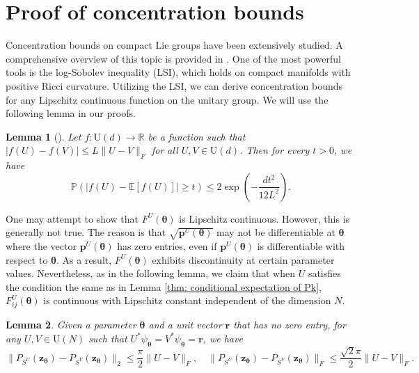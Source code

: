 \documentclass{amsart}
\theoremstyle{plain}
\newtheorem{lemma}{Lemma}
\theoremstyle{definition}
\theoremstyle{remark}
\newcommand{\RR}{\mathbb{R}}
\newcommand{\PP}{\mathbb{P}}
\newcommand{\EE}{\mathbb{E}}
\begin{document}
\section{Proof of concentration bounds}\label{sec:concentration}
Concentration bounds on compact Lie groups have been extensively studied. A comprehensive overview of this topic is provided in \cite{meckes2019random}. One of the most powerful tools is the log-Sobolev inequality (LSI), which holds on compact manifolds with positive Ricci curvature. Utilizing the LSI, we can derive concentration bounds for any Lipschitz continuous function on the unitary group. We will use the following lemma in our proofs. 
\begin{lemma}[\cite{meckes2019random}]
\label{lem:concentration}
    Let $f:\mathrm U(d)\to \RR$ be a function such that $|f(U)-f(V)|\leq L\|U-V\|_F$ for all $U,V\in \mathrm U(d)$. Then for every $t>0$, we have
    \begin{equation}
        \label{eq:concentration1}
        \PP(|f(U)-\EE[f(U)]|\geq t)\leq 2\exp\left(-\frac{dt^2}{12L^2}\right).
    \end{equation}
\end{lemma}
One may attempt to show that $F^U(\bm\theta)$ is Lipschitz continuous. However, this is generally not true. The reason is that $\sqrt{\bm p^U(\bm\theta)}$ may not be differentiable at $\bm\theta$ where the vector $\bm p^U(\bm\theta)$ has zero entries, even if $\bm p^U(\bm\theta)$ is differentiable with respect to $\bm\theta$. As a result, $F^U(\bm\theta)$ exhibits discontinuity at certain parameter values. Nevertheless, as in the following lemma, we claim that when $U$ satisfies the condition the same as in Lemma \ref{thm: conditional expectation of Pk}, $F_{ij}^U(\bm\theta)$ is continuous with Lipschitz constant independent of the dimension $N$. 
\begin{lemma}
\label{lem:keyLip}
    Given a parameter $\bm\theta$ and a unit vector $\bm r$ that has no zero entry, for any $U,V\in \mathrm U(N)$ such that $U^*\psi_{\bm\theta}=V^*\psi_{\bm\theta}=\bm r$, we have 
    \[\|P_{S^U}(\bm z_{\bm\theta})-P_{S^V}(\bm z_{\bm\theta})\|_2\leq \frac{\pi}{2}\|U-V\|_F,\quad \|P_{S^U}(\bm z_{\bm\theta})-P_{S^V}(\bm z_{\bm\theta})\|_F\leq \frac{\sqrt 2\pi}{2}\|U-V\|_F.\]
\end{lemma}
\end{document}

